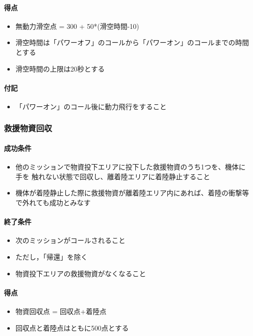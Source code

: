 \paragraph{得点}
\begin{itemize}
\item 無動力滑空点 = 300 + 50*(滑空時間-10)
\item 滑空時間は「パワーオフ」のコールから「パワーオン」のコールまでの時間とする
\item 滑空時間の上限は20秒とする
\end{itemize}
\paragraph{付記}
\begin{itemize}
\item 「パワーオン」のコール後に動力飛行をすること
\end{itemize}
\subsubsection{救援物資回収}
\paragraph{成功条件}
\begin{itemize}
\item 他のミッションで物資投下エリアに投下した救援物資のうち1つを、機体に手を
触れない状態で回収し、離着陸エリアに着陸静止すること
  \item 機体が着陸静止した際に救援物資が離着陸エリア内にあれば、着陸の衝撃等で外れても成功とみなす
\end{itemize}
\paragraph{終了条件}
\begin{itemize}
\item 次のミッションがコールされること
  \item ただし，「帰還」を除く
\item 物資投下エリアの救援物資がなくなること
\end{itemize}
\paragraph{得点}
\begin{itemize}
\item 物資回収点 = 回収点+着陸点
\item 回収点と着陸点はともに500点とする
\end{itemize}
